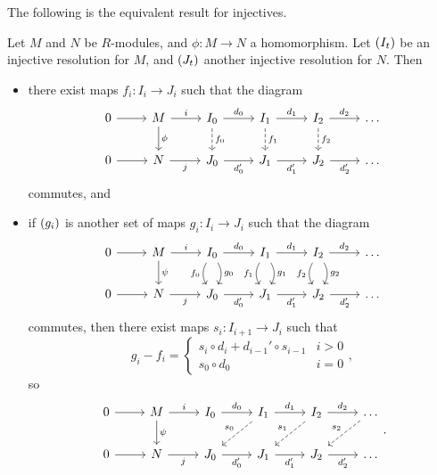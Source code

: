 The following is the equivalent result for injectives.

\begin{proposition}
Let $ M $ and $ N $ be $ R $-modules, and $ \phi : M \to N $ a homomorphism. Let $ \br{I_t} $ be an injective resolution for $ M $, and $ \br{J_t} $ another injective resolution for $ N $. Then
\begin{itemize}
\item there exist maps $ f_i : I_i \to J_i $ such that the diagram
$$
\begin{tikzcd}
0 \arrow{r} & M \arrow{r}{i} \arrow{d}{\phi} & I_0 \arrow{r}{d_0} \arrow[dashed]{d}{f_0} & I_1 \arrow{r}{d_1} \arrow[dashed]{d}{f_1} & I_2 \arrow{r}{d_2} \arrow[dashed]{d}{f_2} & \dots \\
0 \arrow{r} & N \arrow{r}[swap]{j} & J_0 \arrow{r}[swap]{d_0'} & J_1 \arrow{r}[swap]{d_1'} & J_2 \arrow{r}[swap]{d_2'} & \dots
\end{tikzcd}
$$
commutes, and
\item if $ \br{g_i} $ is another set of maps $ g_i : I_i \to J_i $ such that the diagram
$$
\begin{tikzcd}
0 \arrow{r} & M \arrow{r}{i} \arrow{d}{\psi} & I_0 \arrow{r}{d_0} \arrow[bend right=30]{d}[swap]{f_0} \arrow[bend left=30]{d}{g_0} & I_1 \arrow{r}{d_1} \arrow[bend right=30]{d}[swap]{f_1} \arrow[bend left=30]{d}{g_1} & I_2 \arrow{r}{d_2} \arrow[bend right=30]{d}[swap]{f_2} \arrow[bend left=30]{d}{g_2} & \dots \\
0 \arrow{r} & N \arrow{r}[swap]{j} & J_0 \arrow{r}[swap]{d_0'} & J_1 \arrow{r}[swap]{d_1'} & J_2 \arrow{r}[swap]{d_2'} & \dots
\end{tikzcd}
$$
commutes, then there exist maps $ s_i : I_{i + 1} \to J_i $ such that
$$ g_i - f_i =
\begin{cases}
s_i \circ d_i + d_{i - 1}' \circ s_{i - 1} & i > 0 \\
s_0 \circ d_0 & i = 0
\end{cases},
$$
so
$$
\begin{tikzcd}
0 \arrow{r} & M \arrow{r}{i} \arrow{d}{\psi} & I_0 \arrow{r}{d_0} & I_1 \arrow{r}{d_1} \arrow[dashed]{dl}[swap]{s_0} & I_2 \arrow{r}{d_2} \arrow[dashed]{dl}[swap]{s_1} & \dots \arrow[dashed]{dl}[swap]{s_2} \\
0 \arrow{r} & N \arrow{r}[swap]{j} & J_0 \arrow{r}[swap]{d_0'} & J_1 \arrow{r}[swap]{d_1'} & J_2 \arrow{r}[swap]{d_2'} & \dots
\end{tikzcd}.
$$
\end{itemize}
\end{proposition}

